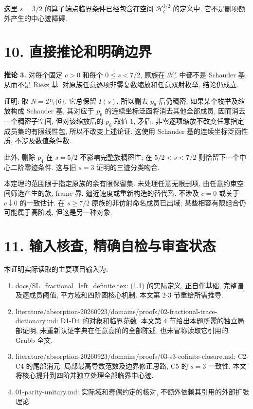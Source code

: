 \documentclass[UTF8,fontset=fandol,11pt,a4paper]{ctexart}
\begin{document}
这里 \(s=3/2\) 的算子端点临界条件已经包含在空间 \(\mathcal H_c^{3/2}\) 的定义中, 它不是删项额外产生的中心迹障碍.


\section*{10. 直接推论和明确边界}

\textbf{推论 3.} 对每个固定 \(c>0\) 和每个 \(0\le s<7/2\), 原族在 \(\mathcal H_c^s\) 中都不是 Schauder 基, 从而不是 Riesz 基. 对原族任意逐项非零复数缩放和任意双射枚举, 结论仍成立.


证明: 取 \(N=\mathcal D\setminus\{6\}\). 它总保留 \(I(s)\), 所以删去 \(p_6\) 后仍稠密. 如果某个枚举及缩放构成 Schauder 基, 其对应于 \(p_6\) 的连续坐标泛函将消去其他全部成员, 因而消去一个稠密子空间, 但对该缩放后的 \(p_6\) 取值 1, 矛盾. 非零逐项缩放不改变任意指定成员集的有限线性包, 所以不改变上述论证. 这使用 Schauder 基的连续坐标泛函性质, 不涉及数值条件数.


此外, 删除 \(p_4\) 在 \(s=5/2\) 不影响完整族稠密性; 在 \(5/2<s<7/2\) 则恰留下一个中心二阶零迹条件. 这与旧 \(s=3\) 证明的三迹分类吻合.


本定理的范围限于指定原族的余有限保留集. 未处理任意无限删项, 由任意约束空间筛选产生的族, frame 界, 逼近速度或重新构造的替代系. 不涉及 \(c=0\) 或关于 \(c\downarrow0\) 的一致估计. 在 \(s\ge7/2\) 原族的非仿射命名成员已出域; 某些相容有限组合仍可能属于高阶域, 但这是另一种对象.


\section*{11. 输入核查, 精确自检与审查状态}

本证明实际读取的主要项目输入为:


\begin{enumerate}

\item 
docs/SL\_fractional\_left\_definite.tex: (1.1) 的实际定义, 正自伴基础, 完整谱及逐成员阈值, 平方域和四阶图核心机制. 本文第 2-3 节重给所需推导.



\item 
literature/absorption-20260923/domains/proofs/02-fractional-trace-dictionary.md: D1-D4 的对象和临界范数. 本文第 4 节给出本题所需的独立局部证明, 未重新认证字典在任意高阶的全部陈述, 也未冒称读取它引用的 Grubb 全文.



\item 
literature/absorption-20260923/domains/proofs/03-s3-cofinite-closure.md: C2-C4 的尾部消元, 局部最高导数范数及边界修正思路, C5 的 \(s=3\) 一致性. 本文将核心提升到四阶并独立处理全部临界中心迹.



\item 
01-parity-unitary.md: 实际域和奇偶约定的核对, 不额外依赖其引用的外部扩张理论.



\end{enumerate}
\end{document}
